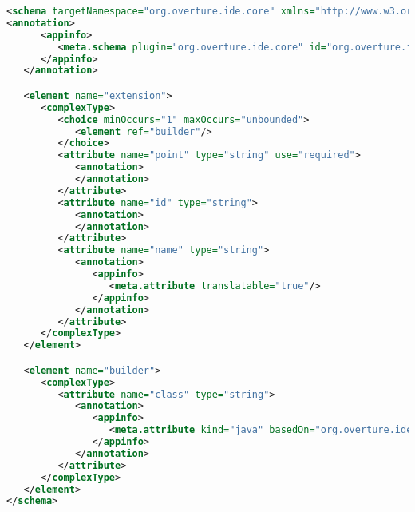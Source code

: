 \begin{lstlisting}[language=XML]
<schema targetNamespace="org.overture.ide.core" xmlns="http://www.w3.org/2001/XMLSchema">
<annotation>
      <appinfo>
         <meta.schema plugin="org.overture.ide.core" id="org.overture.ide.core.buildParticipant" name="Builder"/>
      </appinfo>
   </annotation>

   <element name="extension">
      <complexType>
         <choice minOccurs="1" maxOccurs="unbounded">
            <element ref="builder"/>
         </choice>
         <attribute name="point" type="string" use="required">
            <annotation>
            </annotation>
         </attribute>
         <attribute name="id" type="string">
            <annotation>
            </annotation>
         </attribute>
         <attribute name="name" type="string">
            <annotation>
               <appinfo>
                  <meta.attribute translatable="true"/>
               </appinfo>
            </annotation>
         </attribute>
      </complexType>
   </element>

   <element name="builder">
      <complexType>
         <attribute name="class" type="string">
            <annotation>
               <appinfo>
                  <meta.attribute kind="java" basedOn="org.overture.ide.core.builder.BuildParcitipant:"/>
               </appinfo>
            </annotation>
         </attribute>
      </complexType>
   </element>
</schema>
\end{lstlisting}

